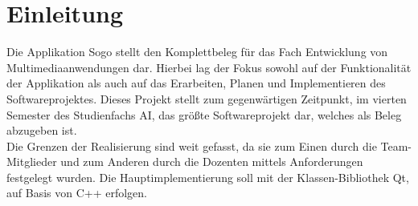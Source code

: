 \documentclass[a4paper]{scrartcl}
\begin{document}
\newpage

%
%
\thispagestyle{empty}

\tableofcontents

\newpage

%
%

\setcounter{page}{3}

\section{Einleitung}\label{Einleitung}
Die Applikation Sogo stellt den Komplettbeleg für das Fach Entwicklung von Multimediaanwendungen dar. Hierbei lag der Fokus sowohl auf der Funktionalität der Applikation als auch auf das Erarbeiten, Planen und Implementieren des Softwareprojektes. Dieses Projekt stellt zum gegenwärtigen Zeitpunkt, im vierten Semester des Studienfachs AI, das größte Softwareprojekt dar, welches als Beleg abzugeben ist.
\\
Die Grenzen der Realisierung sind weit gefasst, da sie zum Einen durch die Team-Mitglieder und zum Anderen durch die Dozenten mittels Anforderungen festgelegt wurden. Die Hauptimplementierung soll mit der Klassen-Bibliothek Qt, auf Basis von C++ erfolgen.

\end{document}
